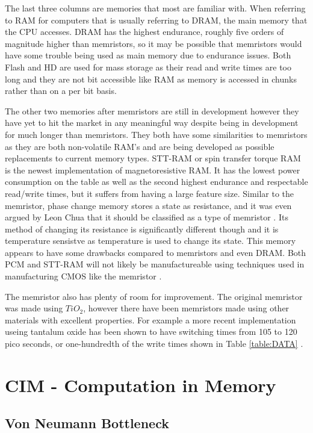 \documentclass{sig-alternate}
\begin{document}
The last three columns are memories that most are familiar with.  When referring to RAM for computers that is usually referring to DRAM, the main memory that the CPU accesses.  DRAM has the highest endurance, roughly five orders of magnitude higher than memristors, so it may be possible that memristors would have some trouble being used as main memory due to endurance issues.  Both Flash and HD are used for mass storage as their read and write times are too long and they are not bit accessible like RAM as memory is accessed in chunks rather than on a per bit basis.  

The other two memories after memristors are still in development however they have yet to hit the market in any meaningful way despite being in development for much longer than memristors.  They both have some similarities to memristors as they are both non-volatile RAM's and are being developed as possible replacements to current memory types.  STT-RAM or spin transfer torque RAM is the newest implementation of magnetoresistive RAM.  It has the lowest power consumption on the table as well as the second highest endurance and respectable read/write times, but it suffers from having a large feature size.  Similar to the memristor, phase change memory stores a state as resistance, and it was even argued by Leon Chua that it should be classified as a type of memristor \cite{chua2}.  Its method of changing its resistance is significantly different though and it is temperature sensistve as temperature is used to change its state.  This memory appears to have some drawbacks compared to memristors and even DRAM.  Both PCM and STT-RAM will not likely be manufactureable using techniques used in manufacturing CMOS like the memristor \cite{pcm} \cite{stt}.  

The memristor also has plenty of room for improvement.  The original memristor was made using $TiO_2$, however there have been memristors made using other materials with excellent properties.  For example a more recent implementation useing tantalum oxide has been shown to have switching times from 105 to 120 pico seconds, or one-hundredth of the write times shown in Table \ref{table:DATA} \cite{0957-4484-22-48-485203}.

\section{CIM - Computation in Memory}
\label{sec:cim}

\subsection{Von Neumann Bottleneck}
\end{document}

